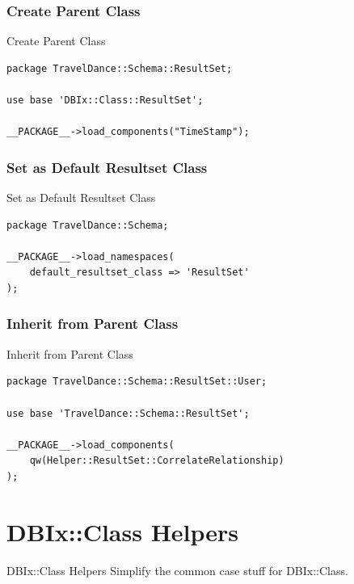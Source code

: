 \subsubsection{Create Parent Class}

\begin{frame}[fragile]{Create Parent Class}
\begin{lstlisting}
package TravelDance::Schema::ResultSet;

use base 'DBIx::Class::ResultSet';

__PACKAGE__->load_components("TimeStamp");
\end{lstlisting}
\end{frame}

\subsubsection{Set as Default Resultset Class}

\begin{frame}[fragile]{Set as Default Resultset Class}
\begin{lstlisting}
package TravelDance::Schema;

__PACKAGE__->load_namespaces(
    default_resultset_class => 'ResultSet'
);

\end{lstlisting}
\end{frame}

\subsubsection{Inherit from Parent Class}
\begin{frame}[fragile]{Inherit from Parent Class}
\begin{lstlisting}
package TravelDance::Schema::ResultSet::User;

use base 'TravelDance::Schema::ResultSet';

__PACKAGE__->load_components(
    qw(Helper::ResultSet::CorrelateRelationship)
);
\end{lstlisting}
\end{frame}

\section{DBIx::Class Helpers}

\begin{frame}{DBIx::Class Helpers}
Simplify the common case stuff for DBIx::Class.
\end{frame}

